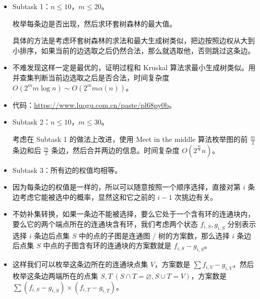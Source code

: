 \documentclass[10pt,aspectratio=43,mathserif]{beamer}
\begin{document}
\begin{frame}

	\begin{itemize} \setlength{\parskip}{0.3\baselineskip}

		\item Subtask 1：$n\leq 10$，$m\leq 20$。

		枚举每条边是否出现，然后求环套树森林的最大值。

		具体的方法是考虑环套树森林的求法和最大生成树类似，把边按照边权从大到小排序，如果当前的边选取之后仍然合法，那么就选取他，否则跳过这条边。

		\item 不难发现这样一定是最优的，证明过程和 Kruskal 算法求最小生成树类似。用并查集判断当前边选取之后是否合法，时间复杂度 $O(2^m m \log n)\sim O(2^m m \alpha (n))$。

		\item 代码：\url{https://www.luogu.com.cn/paste/pl68py0b}。

		\item Subtask 2：$n\leq 10$，$m\leq 30$。

		考虑在 Subtask 1 的做法上改进，使用 Meet in the middle 算法枚举图的前 $\frac{m}{2}$ 条边和后 $\frac{m}{2}$ 条边，然后合并两边的信息。时间复杂度 $O(2^{\frac m 2}n)$。

	\end{itemize}

\end{frame}

\begin{frame}

	\begin{itemize} \setlength{\parskip}{0.3\baselineskip}

		\item Subtask 3：所有边的权值均相等。

		\item 因为每条边的权值是一样的，所以可以随意按照一个顺序选择，直接对第 $i$ 条边考虑它能被选中的概率，显然这和它之前的 $i-1$ 次挑边有关。

		\item 不妨补集转换，如果一条边不能被选择，要么它处于一个含有环的连通块内，要么它的两个端点所在的连通块含有环，我们考虑两个状态 $f_{i,S}, g_{i,S}$ 分别表示选择 $i$ 条边后点集 $S$ 中的点的子图是连通图 / 树的方案数，那么选择 $i$ 条边后点集 $S$ 中点的子图含有环的连通块的方案数就是 $f_{i,S} - g_{i,S}$。

		\item 这样我们可以枚举这条边所在的连通块点集 $V$，方案数是 $\sum f_{i,V}-g_{i,V}$，然后枚举这条边两端所在的点集 $S, T\ (S \cap T=\varnothing,S \cup T=V)$，方案数是 $\sum (f_{i,S} - g_{i,S})\times (f_{i,T} - g_{i,T})$。

	\end{itemize}

\end{frame}
\end{document}
